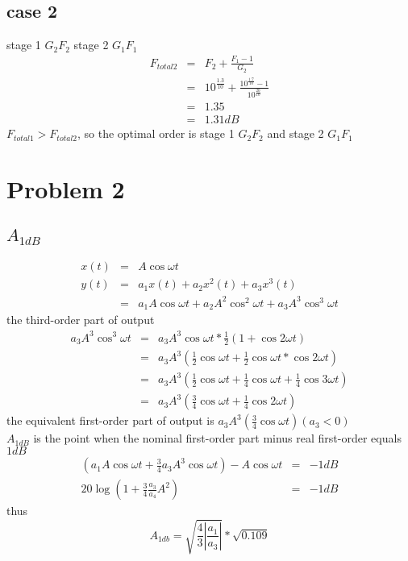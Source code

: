 \documentclass[12pt,a4paper]{article}
\begin{document}
\subsection*{case 2}
stage 1 $G_2 F_2$ stage 2 $G_1 F_1$
\begin{eqnarray*}
F_{total2}&=&F_2+\frac{F_1-1}{G_2}\\
&=&10^{\frac{1.3}{10}}+\frac{10^{\frac{1.7}{10}}-1}{10^{\frac{20}{10}}}\\
&=&1.35\\
&=&1.31 dB
\end{eqnarray*}
$F_{total1}>F_{total2}$, so the optimal order is stage 1 $G_2 F_2$ and stage 2 $G_1 F_1$
\section*{Problem 2}
\subsection*{$A_{1dB}$}
\begin{eqnarray*}
x(t)&=&A\cos{\omega{t}}\\
y(t)&=&a_1x(t)+a_2x^2(t)+a_3x^3(t)\\
&=&a_1A\cos{\omega{t}}+a_2A^2\cos^2{\omega{t}}+a_3A^3\cos^3{\omega{t}}
\end{eqnarray*}
the third-order part of output
\begin{eqnarray*}
a_3A^3\cos^3{\omega{t}}&=&a_3A^3\cos{\omega{t}}*\frac{1}{2}(1+\cos{2\omega{t}})\\
&=&a_3A^3(\frac{1}{2}\cos{\omega{t}}+\frac{1}{2}\cos{\omega{t}}*\cos{2\omega{t}})\\
&=&a_3A^3(\frac{1}{2}\cos{\omega{t}}+\frac{1}{4}\cos{\omega{t}}+\frac{1}{4}\cos{3\omega{t}})\\
&=&a_3A^3(\frac{3}{4}\cos{\omega{t}}+\frac{1}{4}\cos{2\omega{t}})
\end{eqnarray*}
the equivalent first-order part of output is $a_3A^3(\frac{3}{4}\cos{\omega{t}})(a_3<0)$\\
$A_{1dB}$ is the point when the nominal first-order part minus real first-order equals $1dB$
\begin{eqnarray*}
(a_1A\cos{\omega{t}}+\frac{3}{4}a_3A^3\cos{\omega{t}})-A\cos{\omega{t}}&=&-1dB\\
20\log{(1+\frac{3}{4}\frac{a_3}{a_4}A^2)}&=&-1dB
\end{eqnarray*}
thus
\begin{equation}
A_{1db}=\sqrt{\frac{4}{3}\left\vert{\frac{a_1}{a_3}}\right\vert}*\sqrt{0.109}
\end{equation}
\end{document}
